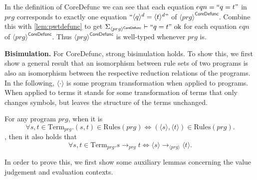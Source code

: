 In the definition of \textsf{CoreDefunc} we can see that each equation $eqn = `` q = t "$ in $prg$ corresponds to exactly one equation $`` \langle q \rangle^d = \langle t \rangle^d "$ of $\langle prg \rangle^{\textsf{CoreDefunc}}$. Combine this with \autoref{lem:pwtdefunc} to get $\Sigma_{\langle prg \rangle^{\textsf{CoreDefunc}}} \vdash `` q = t " \textrm{ ok}$ for each equation $eqn$ of $\langle prg \rangle^{\textsf{CoreDefunc}}$. Thus $\langle prg \rangle^{\textsf{CoreDefunc}}$ is well-typed whenever $prg$ is.

\textbf{Bisimulation.} For \textsf{CoreDefunc}, strong bisimulation holds. To show this, we first show a general result that an isomorphism between rule sets of two programs is also an isomorphism between the respective reduction relations of the programs. In the following, $\langle \cdot \rangle$ is some program transformation when applied to programs. When applied to terms it stands for some transformation of terms that only changes symbols, but leaves the structure of the terms unchanged.

\begin{lemma}
\label{lem:iso}
For any program $prg$, when it is
\[
\forall s,t \in \textrm{Term}_{prg}. (s, t) \in \textrm{Rules}(prg) \iff (\langle s \rangle, \langle t \rangle) \in \textrm{Rules}(prg).
\]
, then it also holds that
\[
\forall s,t \in \textrm{Term}_{prg}. s \longrightarrow_{prg} t \iff \langle s \rangle \longrightarrow_{\langle prg \rangle} \langle t \rangle.
\]
\end{lemma}

In order to prove this, we first show some auxiliary lemmas concerning the value judgement and evaluation contexts.

